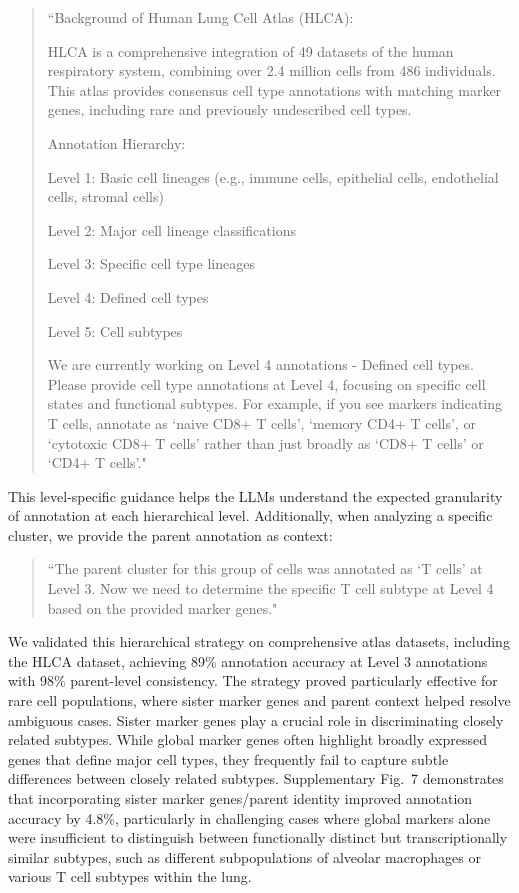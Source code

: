 \documentclass[pdflatex,sn-nature]{sn-jnl}%
\theoremstyle{thmstyleone}%
\theoremstyle{thmstyletwo}%
\theoremstyle{thmstylethree}%
\begin{document}
\begin{quote}
\small
``Background of Human Lung Cell Atlas (HLCA):

HLCA is a comprehensive integration of 49 datasets of the human respiratory system, combining over 2.4 million cells from 486 individuals. This atlas provides consensus cell type annotations with matching marker genes, including rare and previously undescribed cell types.

Annotation Hierarchy:

Level 1: Basic cell lineages (e.g., immune cells, epithelial cells, endothelial cells, stromal cells)

Level 2: Major cell lineage classifications

Level 3: Specific cell type lineages

Level 4: Defined cell types

Level 5: Cell subtypes

We are currently working on Level 4 annotations - Defined cell types. Please provide cell type annotations at Level 4, focusing on specific cell states and functional subtypes. For example, if you see markers indicating T cells, annotate as `naive CD8+ T cells', `memory CD4+ T cells', or `cytotoxic CD8+ T cells' rather than just broadly as `CD8+ T cells' or `CD4+ T cells'."
\end{quote}

This level-specific guidance helps the LLMs understand the expected granularity of annotation at each hierarchical level. Additionally, when analyzing a specific cluster, we provide the parent annotation as context:

\begin{quote}
\small
``The parent cluster for this group of cells was annotated as `T cells' at Level 3. Now we need to determine the specific T cell subtype at Level 4 based on the provided marker genes."
\end{quote}

We validated this hierarchical strategy on comprehensive atlas datasets, including the HLCA dataset, achieving 89\% annotation accuracy at Level 3 annotations with 98\% parent-level consistency. The strategy proved particularly effective for rare cell populations, where sister marker genes and parent context helped resolve ambiguous cases. Sister marker genes play a crucial role in discriminating closely related subtypes. While global marker genes often highlight broadly expressed genes that define major cell types, they frequently fail to capture subtle differences between closely related subtypes. Supplementary Fig.~7 demonstrates that incorporating sister marker genes/parent identity improved annotation accuracy by 4.8\%, particularly in challenging cases where global markers alone were insufficient to distinguish between functionally distinct but transcriptionally similar subtypes, such as different subpopulations of alveolar macrophages or various T cell subtypes within the lung.
\end{document}
